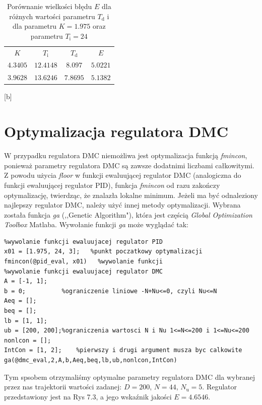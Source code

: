 \begin{table}
	
	\label{t_T_i}
	\centering
	\begin{small}
		\begin{tabular}{|c|c|c|c|}
			\hline
			$K$					&	$T_{\mathrm{i}}$	&	$T_{\mathrm{d}}$	&	$E$				\\
			$\num{4.3405}$		&	$\num{12.4148}$	&	$\num{8.097}$		&	$\num{5.0221}$	\\
			$\num{3.9628}$		&	$\num{13.6246}$	&	$\num{7.8695}$		&	$\num{5.1382}$	\\
			\hline
			\end{tabular}
	\end{small}
[b] \caption{Porównanie wielkości błędu $E$ dla różnych wartości parametru $T_{\mathrm{d}}$ i dla parametru $K=1.975$ oraz parametru $T_{\mathrm{i}}=24$}
\end{table}

\section{Optymalizacja regulatora DMC}


W przypadku regulatora DMC niemożliwa jest optymalizacja funkcją \emph{fmincon}, ponieważ parametry regulatora DMC są zawsze dodatnimi liczbami całkowitymi. Z powodu użycia \emph{floor} w funkcji ewaluującej regulator DMC (analogiczna do funkcji ewaluującej regulator PID), funkcja \emph{fmincon} od razu zakończy optymalizację, twierdząc, że znalazła lokalne minimum. Jeżeli ma być odnaleziony najlepszy regulator DMC, należy użyć innej metody optymalizacji. Wybrana została funkcja \emph{ga} (,,Genetic Algorithm"), która jest częścią \emph{Global Optimization Toolbox} Matlaba. Wywołanie funkcji \emph{ga} może wyglądać tak:

\begin{lstlisting}
%wywolanie funkcji ewaluujacej regulator PID
x01 = [1.975, 24, 3];   %punkt poczatkowy optymalizacji
fmincon(@pid_eval, x01)   %wywolanie funkcji
%wywolanie funkcji ewaluujacej regulator DMC
A = [-1, 1];      
b = 0;          %ograniczenie liniowe -N+Nu<=0, czyli Nu<=N
Aeq = [];
beq = [];
lb = [1, 1];
ub = [200, 200];%ograniczenia wartosci N i Nu 1<=N<=200 i 1<=Nu<=200
nonlcon = [];
IntCon = [1, 2];    %pierwszy i drugi argument musza byc calkowite
ga(@dmc_eval,2,A,b,Aeq,beq,lb,ub,nonlcon,IntCon)
\end{lstlisting}

Tym spsobem otrzymaliśmy optymalne parametry regulatora DMC dla wybranej przez nas trajektorii wartości zadanej: $D=200$, $N=44$, $N_{\mathrm{u}}=5$. Regulator przedstawiony jest na Rys 7.3, a jego wskaźnik jakości $E=\num{4.6546}$. 

